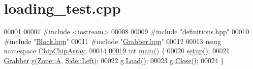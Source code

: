 \hypertarget{loading__test_8cpp_source}{\section{loading\+\_\+test.\+cpp}
\label{loading__test_8cpp_source}
}

\begin{DoxyCode}
00001 
00007 \textcolor{preprocessor}{#include <iostream>}
00008 
00009 \textcolor{preprocessor}{#include "\hyperlink{definitions_8hpp}{definitions.hpp}"}
00010 \textcolor{preprocessor}{#include "\hyperlink{Block_8hpp}{Block.hpp}"}
00011 \textcolor{preprocessor}{#include "\hyperlink{Grabber_8hpp}{Grabber.hpp}"}
00012 
00013 \textcolor{keyword}{using namespace }\hyperlink{namespaceChipChipArray}{ChipChipArray};
00014 
\hypertarget{loading__test_8cpp_source_l00019}{}\hyperlink{loading__test_8cpp_ae66f6b31b5ad750f1fe042a706a4e3d4}{00019} \textcolor{keywordtype}{int} \hyperlink{namespaceChipChipArray_a7fc3d1edffca11531cd09fdab7c8b88d}{main}() \{
00020     \hyperlink{Servo__Position__Shell_8cpp_a4fc01d736fe50cf5b977f755b675f11d}{setup}();
00021     \hyperlink{classChipChipArray_1_1Grabber}{Grabber} g(\hyperlink{definitions_8hpp_adbd1e7a33d3e1751c7b2aa2562d0ecb9a7fc56270e7a70fa81a5935b72eacbe29}{Zone::A}, \hyperlink{definitions_8hpp_a03325a8a9d4f105db5e37dd587128142a945d5e233cf7d6240f6b783b36a374ff}{Side::Left});
00022     g.\hyperlink{classChipChipArray_1_1Grabber_a56639f8f9ba9468bce4b6d69ceb2eb54}{Load}();
00023     g.\hyperlink{classChipChipArray_1_1Grabber_aacf089ceb4aa5b263c2cc702fb3daf74}{Close}();
00024 \}
\end{DoxyCode}
